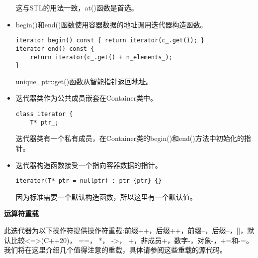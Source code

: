 \begin{itemize}
这与STL的用法一致，at()函数是首选。

\item 
begin()和end()函数使用容器数据的地址调用迭代器构造函数。

\begin{lstlisting}[style=styleCXX]
iterator begin() const { return iterator(c_.get()); }
iterator end() const {
	return iterator(c_.get() + n_elements_);
}
\end{lstlisting}

unique\_ptr::get()函数从智能指针返回地址。

\item 
迭代器类作为公共成员嵌套在Container类中。

\begin{lstlisting}[style=styleCXX]
class iterator {
	T* ptr_;
\end{lstlisting}

迭代器类有一个私有成员，在Container类的begin()和end()方法中初始化的指针。

\item 
迭代器构造函数接受一个指向容器数据的指针。

\begin{lstlisting}[style=styleCXX]
iterator(T* ptr = nullptr) : ptr_{ptr} {}
\end{lstlisting}

因为标准需要一个默认构造函数，所以这里有一个默认值。
\end{itemize}

\noindent
\textbf{运算符重载}

此迭代器为以下操作符提供操作符重载:前缀++，后缀++，前缀--，后缀--，[]，默认比较<=>(C++20)， ==， *， ->， +，非成员+，数字-，对象-，+=和-=。我们将在这里介绍几个值得注意的重载，具体请参阅这些重载的源代码。

